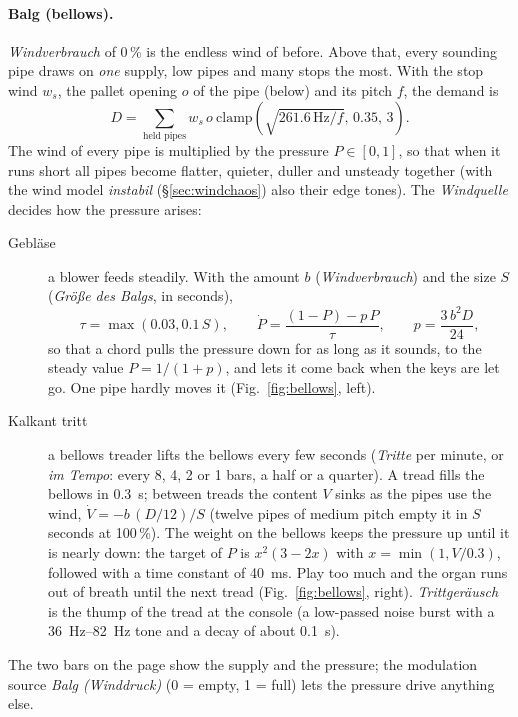 \documentclass[11pt,a4paper,parskip=half,DIV=11,toc=bibliography]{scrartcl}
\newcommand{\ui}[1]{\emph{#1}}                 %
\begin{document}
\paragraph{Balg (bellows).} \ui{Windverbrauch} of 0\,\% is the endless wind of before. Above that, every sounding pipe draws on
\emph{one} supply, low pipes and many stops the most. With the stop wind $w_s$, the pallet opening $o$ of the pipe (below) and
its pitch $f$, the demand is
\begin{equation}
  D = \sum_{\text{held pipes}} w_s\, o\ \mathrm{clamp}\!\left(\sqrt{261.6\,\mathrm{Hz}/f},\,0.35,\,3\right).
\end{equation}
The wind of every pipe is multiplied by the pressure $P\in[0,1]$, so that when it runs short all pipes become flatter,
quieter, duller and unsteady together (with the wind model \ui{instabil} (\S\ref{sec:windchaos}) also their edge tones).
The \ui{Windquelle} decides how the pressure arises:
\begin{description}
  \item[Gebläse] a blower feeds steadily. With the amount $b$ (\ui{Windverbrauch}) and the size $S$ (\ui{Größe des Balgs}, in seconds),
        \begin{equation}
          \tau = \max(0.03, 0.1\,S),\qquad
          \dot P = \frac{(1-P) - p\,P}{\tau},\qquad p = \frac{3\,b^2 D}{24},
        \end{equation}
        so that a chord pulls the pressure down for as long as it sounds, to the steady value $P = 1/(1+p)$, and lets it come
        back when the keys are let go. One pipe hardly moves it (Fig.~\ref{fig:bellows}, left).
  \item[Kalkant tritt] a bellows treader lifts the bellows every few seconds (\ui{Tritte} per minute, or \ui{im Tempo}: every 8, 4, 2 or 1
        bars, a half or a quarter). A tread fills the bellows in \SI{0.3}{s}; between treads the content $V$ sinks as
        the pipes use the wind, $\dot V = -b\,(D/12)/S$ (twelve pipes of medium pitch empty it in $S$ seconds at 100\,\%).
        The weight on the bellows keeps the pressure up until it is nearly down: the target of $P$ is
        $x^2(3-2x)$ with $x=\min(1,V/0.3)$, followed with a time constant of \SI{40}{ms}. Play too much and the organ runs out of
        breath until the next tread (Fig.~\ref{fig:bellows}, right). \ui{Trittgeräusch} is the thump of the tread at the console
        (a low-passed noise burst with a \SIrange{36}{82}{Hz} tone and a decay of about \SI{0.1}{s}).
\end{description}
The two bars on the page show the supply and the pressure; the modulation source \ui{Balg (Winddruck)} (0 = empty, 1 = full)
lets the pressure drive anything else.
\end{document}
